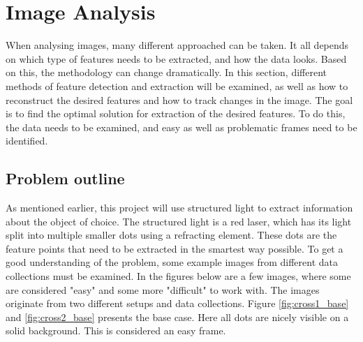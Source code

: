 \newpage
\section{Image Analysis}

When analysing images, many different approached can be taken. It all depends on which type of features needs to be extracted, and how the data looks. Based on this, the methodology can change dramatically. In this section, different methods of feature detection and extraction will be examined, as well as how to reconstruct the desired features and how to track changes in the image. The goal is to find the optimal solution for extraction of the desired features. To do this, the data needs to be examined, and easy as well as problematic frames need to be identified. 


\subsection{Problem outline} \label{imageanalysis:problemoutline}
As mentioned earlier, this project will use structured light to extract information about the object of choice. The structured light is a red laser, which has its light split into multiple smaller dots using a refracting element. These dots are the feature points that need to be extracted in the smartest way possible. To get a good understanding of the problem, some example images from different data collections must be examined. In the figures below are a few images, where some are considered "easy" and some more "difficult" to work with. The images originate from two different setups and data collections. 
Figure \ref{fig:cross1_base} and \ref{fig:cross2_base} presents the base case. Here all dots are nicely visible on a solid background. This is considered an easy frame.
